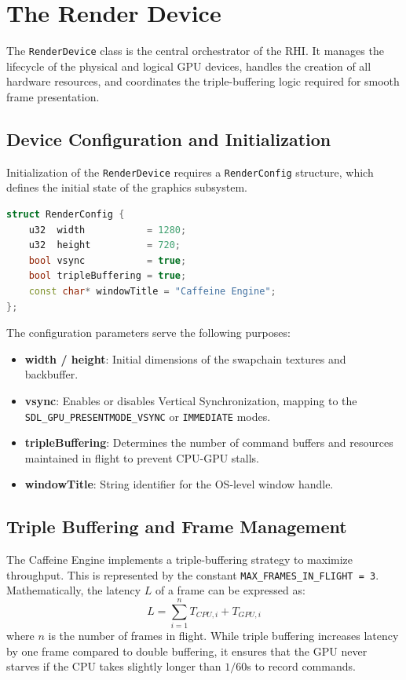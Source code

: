 \section{The Render Device}

The \texttt{RenderDevice} class is the central orchestrator of the RHI. It manages the lifecycle of the physical and logical GPU devices, handles the creation of all hardware resources, and coordinates the triple-buffering logic required for smooth frame presentation.

\subsection{Device Configuration and Initialization}

Initialization of the \texttt{RenderDevice} requires a \texttt{RenderConfig} structure, which defines the initial state of the graphics subsystem.

\begin{lstlisting}[language=C++]
struct RenderConfig {
    u32  width           = 1280;
    u32  height          = 720;
    bool vsync           = true;
    bool tripleBuffering = true;
    const char* windowTitle = "Caffeine Engine";
};
\end{lstlisting}

The configuration parameters serve the following purposes:
\begin{itemize}
    \item \textbf{width / height}: Initial dimensions of the swapchain textures and backbuffer.
    \item \textbf{vsync}: Enables or disables Vertical Synchronization, mapping to the \texttt{SDL\_GPU\_PRESENTMODE\_VSYNC} or \texttt{IMMEDIATE} modes.
    \item \textbf{tripleBuffering}: Determines the number of command buffers and resources maintained in flight to prevent CPU-GPU stalls.
    \item \textbf{windowTitle}: String identifier for the OS-level window handle.
\end{itemize}

\subsection{Triple Buffering and Frame Management}

The Caffeine Engine implements a triple-buffering strategy to maximize throughput. This is represented by the constant \texttt{MAX\_FRAMES\_IN\_FLIGHT = 3}. Mathematically, the latency $L$ of a frame can be expressed as:
\begin{equation}
    L = \sum_{i=1}^{n} T_{CPU,i} + T_{GPU,i}
\end{equation}
where $n$ is the number of frames in flight. While triple buffering increases latency by one frame compared to double buffering, it ensures that the GPU never starves if the CPU takes slightly longer than $1/60$s to record commands.


